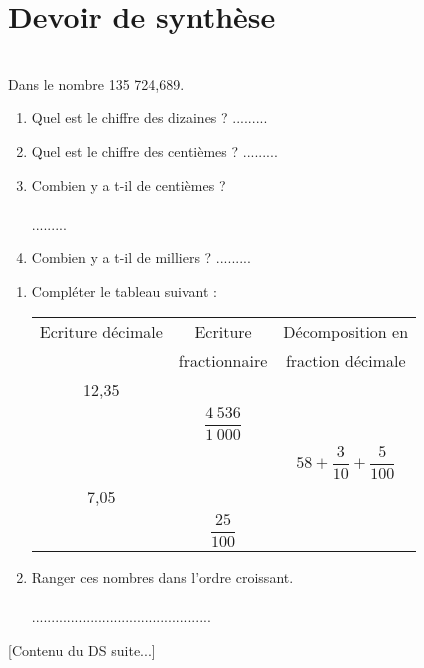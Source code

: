 


\pagestyle{empty}

\section*{Devoir de synthèse}

\begin{multicols}{2}
\\
Dans le nombre 135 724,689.
\begin{enumerate}
\item Quel est le chiffre des dizaines ? .........
\item Quel est le chiffre des centièmes ? .........
\item Combien y a t-il de centièmes ?\\\\ .........
\item Combien y a t-il de milliers ? .........
\end{enumerate}

\columnbreak

\begin{enumerate}
\item Compléter le tableau suivant :\\
\renewcommand{\arraystretch}{2.5}
\begin{tabular}{| c | c | c |}
\hline
Ecriture décimale & Ecriture & Décomposition en\\
 & fractionnaire & fraction décimale\\
\hline
12,35&&\\
\hline
&$\dfrac{4~536}{1~000}$ &\\
\hline
&&$58+\dfrac{3}{10}+\dfrac{5}{100}$\\
\hline
7,05&&\\
\hline
&$\dfrac{25}{100}$&\\
\hline
\end{tabular}
\item Ranger ces nombres dans l'ordre croissant.\\\\..............................................
\end{enumerate}
\end{multicols}

[Contenu du DS suite...]


